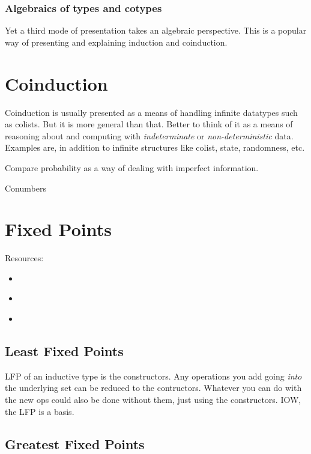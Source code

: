 \documentclass{article}
\begin{document}
\subsubsection{Algebraics of types and cotypes}

Yet a third mode of presentation takes an algebraic perspective. This
is a popular way of presenting and explaining induction and
coinduction.

\section{Coinduction}

Coinduction is usually presented as a means of handling infinite
datatypes such as colists. But it is more general than that. Better to
think of it as a means of reasoning about and computing with
\textit{indeterminate} or \textit{non-deterministic} data. Examples
are, in addition to infinite structures like colist, state,
randomness, etc.

Compare probability as a way of dealing with imperfect information.

Conumbers


\section{Fixed Points}

Resources:

\begin{itemize}
\item {} \cite{lawvere1997conceptual}
\item {} \cite{davey2002introduction}
\item {} \cite{stoy1977denotational}
\end{itemize}

\subsection{Least Fixed Points}

LFP of an inductive type is the constructors. Any operations you add
going \textit{into} the underlying set can be reduced to the
contructors. Whatever you can do with the new ops could also be done
without them, just using the constructors. IOW, the LFP is a basis.

\subsection{Greatest Fixed Points}
\end{document}
